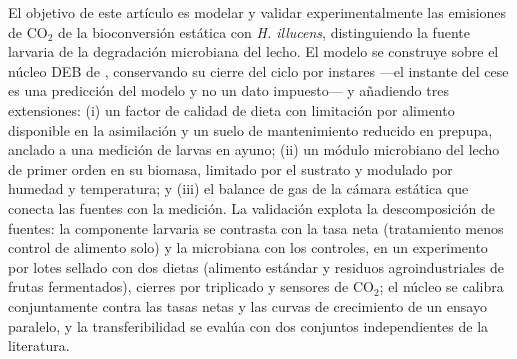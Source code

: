 El objetivo de este artículo es modelar y validar experimentalmente las emisiones de CO$_2$ de la bioconversión estática con \textit{H. illucens}, distinguiendo la fuente larvaria de la degradación microbiana del lecho. El modelo se construye sobre el núcleo DEB de \textcite{eriksenDynamicModellingFeed2022,eriksenMetabolicPerformanceFeed2024}, conservando su cierre del ciclo por instares ---el instante del cese es una predicción del modelo y no un dato impuesto--- y añadiendo tres extensiones: (i) un factor de calidad de dieta con limitación por alimento disponible en la asimilación y un suelo de mantenimiento reducido en prepupa, anclado a una medición de larvas en ayuno; (ii) un módulo microbiano del lecho de primer orden en su biomasa, limitado por el sustrato y modulado por humedad y temperatura; y (iii) el balance de gas de la cámara estática que conecta las fuentes con la medición. La validación explota la descomposición de fuentes: la componente larvaria se contrasta con la tasa neta (tratamiento menos control de alimento solo) y la microbiana con los controles, en un experimento por lotes sellado con dos dietas (alimento estándar y residuos agroindustriales de frutas fermentados), cierres por triplicado y sensores de CO$_2$; el núcleo se calibra conjuntamente contra las tasas netas y las curvas de crecimiento de un ensayo paralelo, y la transferibilidad se evalúa con dos conjuntos independientes de la literatura.
